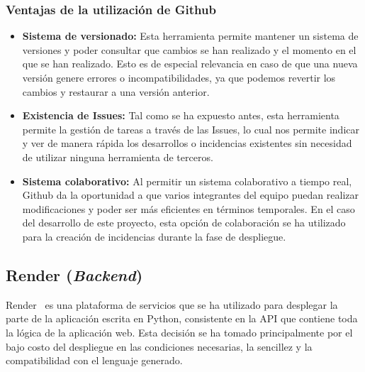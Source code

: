  \subsubsection{Ventajas de la utilización de Github}
 \begin{itemize}
     \item \textbf{Sistema de versionado:} 
     Esta herramienta permite mantener un sistema de versiones y poder consultar que cambios se han realizado y el momento en el que se han realizado. Esto es de especial relevancia en caso de que una nueva versión genere errores o incompatibilidades, ya que podemos revertir los cambios y restaurar a una versión anterior.
     \item \textbf{Existencia de Issues: }
     Tal como se ha expuesto antes, esta herramienta permite la gestión de tareas a través de las Issues, lo cual nos permite indicar y ver de manera rápida los desarrollos o incidencias existentes sin necesidad de utilizar ninguna herramienta de terceros.
     \item \textbf{Sistema colaborativo: }
     Al permitir un sistema colaborativo a tiempo real, Github da la oportunidad a que varios integrantes del equipo puedan realizar modificaciones y poder ser más eficientes en términos temporales. En el caso del desarrollo de este proyecto, esta opción de colaboración se ha utilizado para la creación de incidencias durante la fase de despliegue.
 \end{itemize}
 
 \subsection{Render (\textit{Backend})}
 Render~\cite{Render} es una plataforma de servicios que se ha utilizado para desplegar la parte de la aplicación escrita en Python, consistente en la API que contiene toda la lógica de la aplicación web. Esta decisión se ha tomado principalmente por el bajo costo del despliegue en las condiciones necesarias, la sencillez y la compatibilidad con el lenguaje generado.
 
